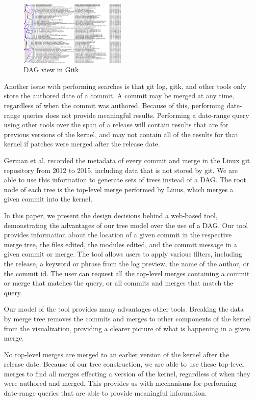 \documentclass[conference, draftclsnofoot]{IEEEtran}
\begin{document}
\begin{figure}
	\centering
	\includegraphics[width=0.47\textwidth]{figures/gitk.png}
	\caption{DAG view in Gitk}
	\label{fig:gitk}
\end{figure}

Another issue with performing searches is that git log, gitk, and other tools
only store the authored date of a commit. A commit may be merged at any time,
regardless of when the commit was authored. Because of this, performing
date-range queries does not provide meaningful results. Performing a date-range
query using other tools over the span of a release will contain results that
are for previous versions of the kernel, and may not contain all of the results
for that kernel if patches were merged after the release date.

German et al. recorded the metadata of every commit and merge in the Linux git
repository from 2012 to 2015, including data that is not stored by git. We are
able to use this information to generate sets of trees instead of a DAG. The
root node of each tree is the top-level merge performed by Linus, which merges
a given commit into the kernel.

In this paper, we present the design decisions behind a web-based tool,
demonstrating the advantages of our tree model over the use of a DAG. Our tool
provides information about the location of a given commit in the respective
merge tree, the files edited, the modules edited, and the commit message in a
given commit or merge. The tool allows users to apply various filters,
including the release, a keyword or phrase from the log preview, the name of
the author, or the commit id. The user can request all the top-level merges
containing a commit or merge that matches the query, or all commits and merges
that match the query.

Our model of the tool provides many advantages other tools. Breaking the data
by merge tree removes the commits and merges to other components of the kernel
from the visualization, providing a clearer picture of what is happening in a
given merge.

No top-level merges are merged to an earlier version of the kernel after the
release date. Because of our tree construction, we are able to use these
top-level merges to find all merges effecting a version of the kernel,
regardless of when they were authored and merged. This provides us with
mechanisms for performing date-range queries that are able to provide
meaningful information.
\end{document}
